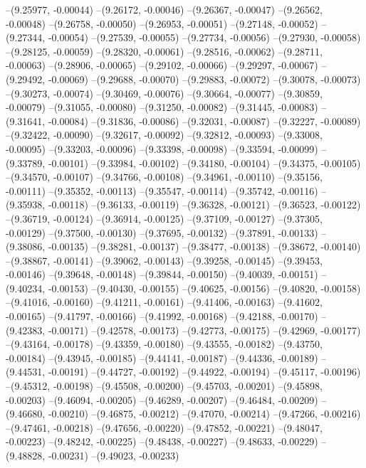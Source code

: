 --(9.25977, -0.00044)
--(9.26172, -0.00046)
--(9.26367, -0.00047)
--(9.26562, -0.00048)
--(9.26758, -0.00050)
--(9.26953, -0.00051)
--(9.27148, -0.00052)
--(9.27344, -0.00054)
--(9.27539, -0.00055)
--(9.27734, -0.00056)
--(9.27930, -0.00058)
--(9.28125, -0.00059)
--(9.28320, -0.00061)
--(9.28516, -0.00062)
--(9.28711, -0.00063)
--(9.28906, -0.00065)
--(9.29102, -0.00066)
--(9.29297, -0.00067)
--(9.29492, -0.00069)
--(9.29688, -0.00070)
--(9.29883, -0.00072)
--(9.30078, -0.00073)
--(9.30273, -0.00074)
--(9.30469, -0.00076)
--(9.30664, -0.00077)
--(9.30859, -0.00079)
--(9.31055, -0.00080)
--(9.31250, -0.00082)
--(9.31445, -0.00083)
--(9.31641, -0.00084)
--(9.31836, -0.00086)
--(9.32031, -0.00087)
--(9.32227, -0.00089)
--(9.32422, -0.00090)
--(9.32617, -0.00092)
--(9.32812, -0.00093)
--(9.33008, -0.00095)
--(9.33203, -0.00096)
--(9.33398, -0.00098)
--(9.33594, -0.00099)
--(9.33789, -0.00101)
--(9.33984, -0.00102)
--(9.34180, -0.00104)
--(9.34375, -0.00105)
--(9.34570, -0.00107)
--(9.34766, -0.00108)
--(9.34961, -0.00110)
--(9.35156, -0.00111)
--(9.35352, -0.00113)
--(9.35547, -0.00114)
--(9.35742, -0.00116)
--(9.35938, -0.00118)
--(9.36133, -0.00119)
--(9.36328, -0.00121)
--(9.36523, -0.00122)
--(9.36719, -0.00124)
--(9.36914, -0.00125)
--(9.37109, -0.00127)
--(9.37305, -0.00129)
--(9.37500, -0.00130)
--(9.37695, -0.00132)
--(9.37891, -0.00133)
--(9.38086, -0.00135)
--(9.38281, -0.00137)
--(9.38477, -0.00138)
--(9.38672, -0.00140)
--(9.38867, -0.00141)
--(9.39062, -0.00143)
--(9.39258, -0.00145)
--(9.39453, -0.00146)
--(9.39648, -0.00148)
--(9.39844, -0.00150)
--(9.40039, -0.00151)
--(9.40234, -0.00153)
--(9.40430, -0.00155)
--(9.40625, -0.00156)
--(9.40820, -0.00158)
--(9.41016, -0.00160)
--(9.41211, -0.00161)
--(9.41406, -0.00163)
--(9.41602, -0.00165)
--(9.41797, -0.00166)
--(9.41992, -0.00168)
--(9.42188, -0.00170)
--(9.42383, -0.00171)
--(9.42578, -0.00173)
--(9.42773, -0.00175)
--(9.42969, -0.00177)
--(9.43164, -0.00178)
--(9.43359, -0.00180)
--(9.43555, -0.00182)
--(9.43750, -0.00184)
--(9.43945, -0.00185)
--(9.44141, -0.00187)
--(9.44336, -0.00189)
--(9.44531, -0.00191)
--(9.44727, -0.00192)
--(9.44922, -0.00194)
--(9.45117, -0.00196)
--(9.45312, -0.00198)
--(9.45508, -0.00200)
--(9.45703, -0.00201)
--(9.45898, -0.00203)
--(9.46094, -0.00205)
--(9.46289, -0.00207)
--(9.46484, -0.00209)
--(9.46680, -0.00210)
--(9.46875, -0.00212)
--(9.47070, -0.00214)
--(9.47266, -0.00216)
--(9.47461, -0.00218)
--(9.47656, -0.00220)
--(9.47852, -0.00221)
--(9.48047, -0.00223)
--(9.48242, -0.00225)
--(9.48438, -0.00227)
--(9.48633, -0.00229)
--(9.48828, -0.00231)
--(9.49023, -0.00233)
